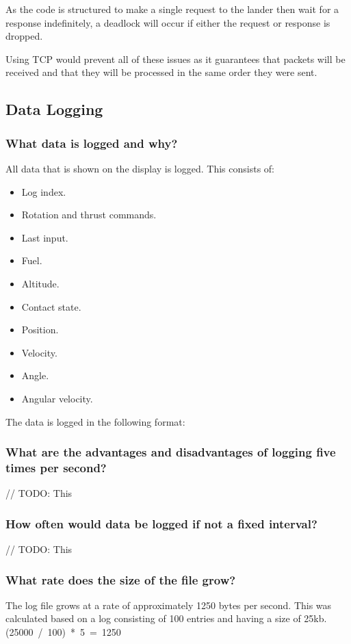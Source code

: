 \documentclass{article}
\begin{document}
{    As the code is structured to make a single request to the lander then
    wait for a response indefinitely, a deadlock will occur if either the
    request or response is dropped.

    Using TCP would prevent all of these issues as it guarantees that packets
    will be received and that they will be processed in the same order they
    were sent.

    \subsection{Data Logging}

        \subsubsection{What data is logged and why?}
        All data that is shown on the display is logged. This consists of:
        \begin{itemize}
            \item Log index.
            \item Rotation and thrust commands.
            \item Last input.
            \item Fuel.
            \item Altitude.
            \item Contact state.
            \item Position.
            \item Velocity.
            \item Angle.
            \item Angular velocity.
        \end{itemize}

        The data is logged in the following format:
        

        \subsubsection{What are the advantages and disadvantages of logging five times per second?}
        // TODO: This

        \subsubsection{How often would data be logged if not a fixed interval?}
        // TODO: This

        \subsubsection{{What rate does the size of the file grow?}}
        The log file grows at a rate of approximately 1250 bytes per second.
        This was calculated based on a log consisting of 100 entries and having
        a size of 25kb. \mbox{(25000 / 100) * 5 = 1250}
}
\end{document}
